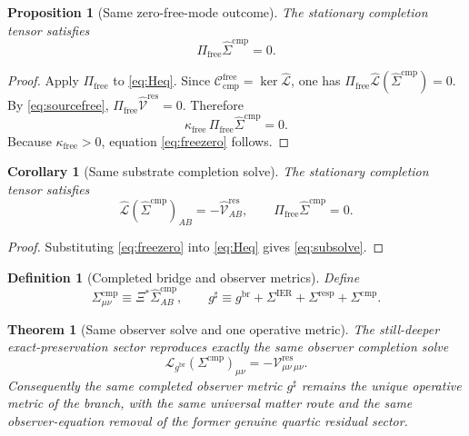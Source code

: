 \documentclass[11pt]{article}
\newcommand{\ObserverMap}{\Xi}
\newcommand{\ObserverMetric}{g^{\mathrm{br}}}
\newcommand{\CompletedMetric}{g^{\sharp}}
\newcommand{\BaseShift}{\Sigma^{\mathrm{IER}}}
\newcommand{\ResponseShift}{\Sigma^{\mathrm{resp}}}
\newcommand{\CompShift}{\Sigma^{\mathrm{cmp}}}
\newcommand{\CompLift}{\widehat\Sigma^{\mathrm{cmp}}}
\newcommand{\ResidualCore}{\mathcal V_{\mu\nu}^{\mathrm{res}}}
\newcommand{\ResidualLift}{\widehat{\mathcal V}^{\mathrm{res}}}
\newcommand{\SubReducedEin}{\widehat{\mathcal L}}
\newcommand{\FreeProj}{\Pi_{\mathrm{free}}}
\newcommand{\ReducedEin}{\mathcal L_{\ObserverMetric}}
\newcommand{\CompFree}{\mathscr C_{\mathrm{cmp}}^{\mathrm{free}}}
\newcommand{\FreeStiff}{\kappa_{\mathrm{free}}}
\newtheorem{definition}{Definition}
\newtheorem{proposition}{Proposition}
\newtheorem{corollary}{Corollary}
\newtheorem{theorem}{Theorem}
\begin{document}
\begin{proposition}[Same zero-free-mode outcome]
\label{prop:freezero}
The stationary completion tensor satisfies
\begin{equation}
\FreeProj\CompLift=0.
\label{eq:freezero}
\end{equation}
\end{proposition}

\begin{proof}
Apply \(\FreeProj\) to \eqref{eq:Heq}. Since \(\CompFree=\ker\SubReducedEin\), one has \(\FreeProj\SubReducedEin(\CompLift)=0\). By \eqref{eq:sourcefree}, \(\FreeProj\ResidualLift=0\). Therefore
\[
\FreeStiff\,\FreeProj\CompLift=0.
\]
Because \(\FreeStiff>0\), equation \eqref{eq:freezero} follows.
\end{proof}

\begin{corollary}[Same substrate completion solve]
\label{cor:subsolve}
The stationary completion tensor satisfies
\begin{equation}
\SubReducedEin(\CompLift)_{AB}
=
-\ResidualLift_{AB},
\qquad
\FreeProj\CompLift=0.
\label{eq:subsolve}
\end{equation}
\end{corollary}

\begin{proof}
Substituting \eqref{eq:freezero} into \eqref{eq:Heq} gives \eqref{eq:subsolve}.
\end{proof}

\begin{definition}[Completed bridge and observer metrics]
\label{def:completed}
Define
\begin{equation}
\CompShift_{\mu\nu}
\equiv
\ObserverMap^*\CompLift_{AB},
\qquad
\CompletedMetric
\equiv
\ObserverMetric+\BaseShift+\ResponseShift+\CompShift.
\label{eq:completedmetric}
\end{equation}
\end{definition}

\begin{theorem}[Same observer solve and one operative metric]
\label{thm:observer}
The still-deeper exact-preservation sector reproduces exactly the same observer completion solve
\begin{equation}
\ReducedEin(\CompShift)_{\mu\nu}
=
-\ResidualCore{}_{\mu\nu}.
\label{eq:observereq}
\end{equation}
Consequently the same completed observer metric \(\CompletedMetric\) remains the unique operative metric of the branch, with the same universal matter route and the same observer-equation removal of the former genuine quartic residual sector.
\end{theorem}
\end{document}
